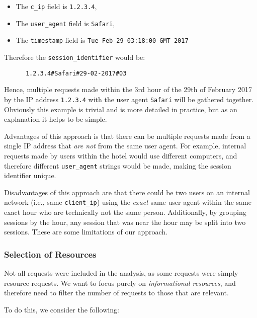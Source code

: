 \begin{itemize}
  \item The \texttt{c\_ip} field is \texttt{1.2.3.4},
  \item The \texttt{user\_agent} field is \texttt{Safari},
  \item The \texttt{timestamp} field is \texttt{Tue Feb 29 03:18:00 GMT 2017}
\end{itemize}

Therefore the \texttt{session\_identifier} would be:

\begin{lstlisting}
      1.2.3.4#Safari#29-02-2017#03
\end{lstlisting}

Hence, multiple requests made within the 3rd hour of the 29th of February 2017 by the IP address \texttt{1.2.3.4} with the user agent \texttt{Safari} will be gathered together. Obviously this example is trivial and is more detailed in practice, but as an explanation it helps to be simple.

Advantages of this approach is that there can be multiple requests made from a single IP address that \textit{are not} from the same user agent. For example, internal requests made by users within the hotel would use different computers, and therefore different \texttt{user\_agent} strings would be made, making the session identifier unique.

Disadvantages of this approach are that there could be two users on an internal network (i.e., same \texttt{client\_ip}) using the \textit{exact} same user agent within the same exact hour who are technically not the same person. Additionally, by grouping sessions by the hour, any session that was near the hour may be split into two sessions. These are some limitations of our approach.

\subsubsection{Selection of Resources}
\label{sec:method:assumptions:selection_of_resources}

Not all requests were included in the analysis, as some requests were simply resource requests. We want to focus purely on \textit{informational resources}, and therefore need to filter the number of requests to those that are relevant.

To do this, we consider the following:

